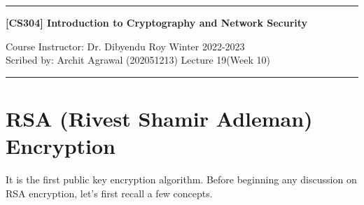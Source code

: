 \documentclass[11pt]{article}
\begin{document}
\noindent
\rule{\textwidth}{1pt}
\begin{center}
{\bf [CS304] Introduction to Cryptography and Network Security}
\end{center}
Course Instructor: Dr. Dibyendu Roy \hfill Winter 2022-2023\\
Scribed by: Archit Agrawal (202051213) \hfill Lecture 19(Week 10)
\\
\rule{\textwidth}{1pt}

\section{RSA (Rivest Shamir Adleman) Encryption}
It is the first public key encryption algorithm. Before beginning any discussion on RSA encryption, let's first recall a few concepts.
\end{document}
